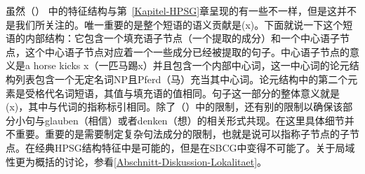\begin{figure}
\eanoraggedright
{}
\z
\vspace{-\baselineskip}
\end{figure}%
虽然（） 中的特征结构与第~\ref{Kapitel-HPSG}章呈现的有一些不一样，但是这并不是我们所关注的。唯一重要的是整个短语的语义贡献是(x)。下面就说一下这个短语的内部结构：它包含一个填充语子节点（一个提取的成分）和一个中心语子节点，这个中心语子节点对应着一个一些成分已经被提取的句子。中心语子节点的意义是a horse kicks x（一匹马踢x）并且包含一个内部中心词，这一中心词的论元结构列表包含一个无定名词NP且Pferd（马）充当其中心词。论元结构中的第二个元素是受格代名词短语，其\localc 值与填充语的\localc 值相同。句子这一部分的整体意义就是 (x)，其中与代词的指称标引相同。除了（）中的限制，还有别的限制以确保该部分小句与glauben（相信）或者denken（想）的相关形式共现。在这里具体细节并不重要。重要的是需要制定复杂句法成分的限制，也就是说可以指称子节点的子节点。在经典HPSG结构特征中是可能的，但是在SBCG中变得不可能了。关于局域性更为概括的讨论，参看\ref{Abschnitt-Diskussion-Lokalitaet}。
